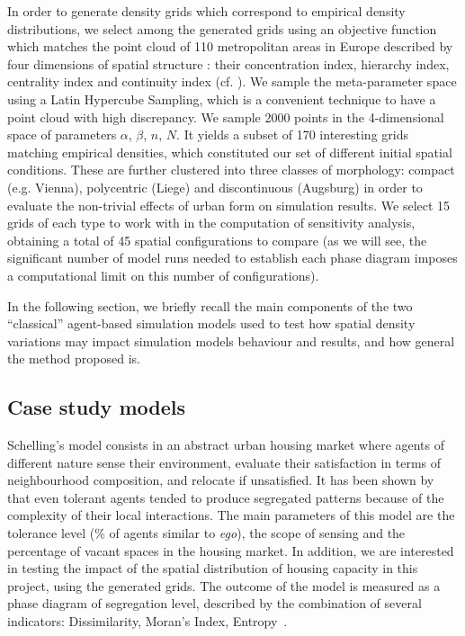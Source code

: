 \documentclass[Royal,sageh,times]{sagej}
\begin{document}

In order to generate density grids which correspond to empirical density distributions, we select among the generated grids using an objective function which matches the point cloud of 110 metropolitan areas in Europe described by four dimensions of spatial structure : their concentration index, hierarchy index, centrality index and continuity index (cf. \cite{LeNechet2015}). We sample the meta-parameter space using a Latin Hypercube Sampling, which is a convenient technique to have a point cloud with high discrepancy. We sample 2000 points in the 4-dimensional space of parameters {$\alpha$, $\beta$, $n$, $N$}. It yields a subset of 170 interesting grids matching empirical densities, which constituted our set of different initial spatial conditions. These are further clustered into three classes of morphology: compact (e.g. Vienna), polycentric (Liege) and discontinuous (Augsburg) in order to evaluate the non-trivial effects of urban form on simulation results. We select 15 grids of each type to work with in the computation of sensitivity analysis, obtaining a total of 45 spatial configurations to compare (as we will see, the significant number of model runs needed to establish each phase diagram imposes a computational limit on this number of configurations).






In the following section, we briefly recall the main components of the two ``classical'' agent-based simulation models used to test how spatial density variations may impact simulation models behaviour and results, and how general the method proposed is.

\subsection{Case study models}


Schelling's model consists in an abstract urban housing market where agents of different nature sense their environment, evaluate their satisfaction in terms of neighbourhood composition, and relocate if unsatisfied. It has been shown by \cite{Schelling1969} that even tolerant agents tended to produce segregated patterns because of the complexity of their local interactions. The main parameters of this model are the tolerance level (\% of agents similar to {\it ego}), the scope of sensing and the percentage of vacant spaces in the housing market. In addition, we are interested in testing the impact of the spatial distribution of housing capacity in this project, using the generated grids. The outcome of the model is measured as a phase diagram of segregation level, described by the combination of several indicators: Dissimilarity, Moran's Index, Entropy~\citep{brown2006spatial}.
\end{document}

